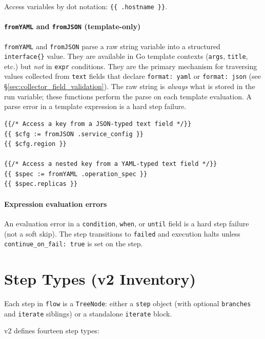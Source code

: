 Access variables by dot notation:
\texttt{\{\{\ .hostname\ \}\}}.

\paragraph{\texttt{fromYAML} and \texttt{fromJSON} (template-only)}
\texttt{fromYAML} and \texttt{fromJSON} parse a raw string variable into a structured
\texttt{interface\{\}} value.  They are available in Go template contexts
(\texttt{args}, \texttt{title}, etc.) but \emph{not} in \texttt{expr} conditions.
They are the primary mechanism for traversing values collected from \texttt{text}
fields that declare \texttt{format: yaml} or \texttt{format: json} (see
§\ref{sec:collector_field_validation}).  The raw string is \emph{always} what is
stored in the run variable; these functions perform the parse on each template
evaluation.  A parse error in a template expression is a hard step failure.

\begin{verbatim}
{{/* Access a key from a JSON-typed text field */}}
{{ $cfg := fromJSON .service_config }}
{{ $cfg.region }}

{{/* Access a nested key from a YAML-typed text field */}}
{{ $spec := fromYAML .operation_spec }}
{{ $spec.replicas }}
\end{verbatim}

\paragraph{Expression evaluation errors}

An evaluation error in a \texttt{condition}, \texttt{when}, or \texttt{until}
field is a hard step failure (not a soft skip).  The step transitions to
\texttt{failed} and execution halts unless \texttt{continue\_on\_fail: true} is
set on the step.

\section{Step Types (v2 Inventory)}
\label{sec:step-types}

Each step in \texttt{flow} is a \texttt{TreeNode}: either a \texttt{step} object
(with optional \texttt{branches} and \texttt{iterate} siblings) or a standalone
\texttt{iterate} block.

v2 defines fourteen step types:

